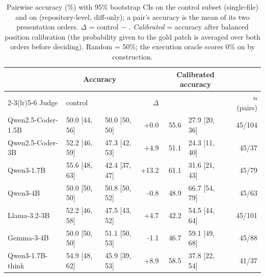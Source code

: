\begin{table}[t]
\caption{Pairwise accuracy (\%) with 95\% bootstrap CIs on the \CJB{} control subset (single-file) and on \RJB{} (repository-level, diff-only); a pair's accuracy is the mean of its two presentation orders. $\Delta$ = control $-$ \RJB{}. \emph{Calibrated} = accuracy after balanced position calibration (the probability given to the gold patch is averaged over both orders before deciding). Random = 50\%; the execution oracle scores 0\% on \RJB{} by construction.}
\label{tab:main}
\centering\footnotesize
\begin{tabular}{@{}lllrrlr@{}}
\toprule
 & \multicolumn{2}{c}{Accuracy} & & \multicolumn{2}{c}{Calibrated accuracy} & \\
\cmidrule(lr){2-3}\cmidrule(lr){5-6}
Judge & \CJB{} control & \RJB{} & $\Delta$ & \CJB{} & \RJB{} & $n$ (pairs) \\
\midrule
Qwen2.5-Coder-1.5B & 50.0 [44, 56] & 50.0 [50, 50] & +0.0 & 55.6 & 27.9 [20, 36] & 45/104 \\
Qwen2.5-Coder-3B & 52.2 [46, 59] & 47.3 [42, 53] & +4.9 & 51.1 & 24.3 [11, 40] & 45/37 \\
Qwen3-1.7B & 55.6 [48, 63] & 42.4 [37, 47] & +13.2 & 61.1 & 31.6 [21, 43] & 45/79 \\
Qwen3-4B & 50.0 [50, 50] & 50.8 [50, 52] & -0.8 & 48.9 & 66.7 [54, 79] & 45/63 \\
Llama-3.2-3B & 52.2 [46, 58] & 47.5 [43, 52] & +4.7 & 42.2 & 54.5 [44, 64] & 45/101 \\
Gemma-3-4B & 50.0 [50, 50] & 51.1 [50, 53] & -1.1 & 46.7 & 59.1 [49, 68] & 45/88 \\
Qwen3-1.7B-think & 54.9 [48, 62] & 45.9 [39, 53] & +8.9 & 58.5 & 37.8 [22, 54] & 41/37 \\
\bottomrule
\end{tabular}
\end{table}
